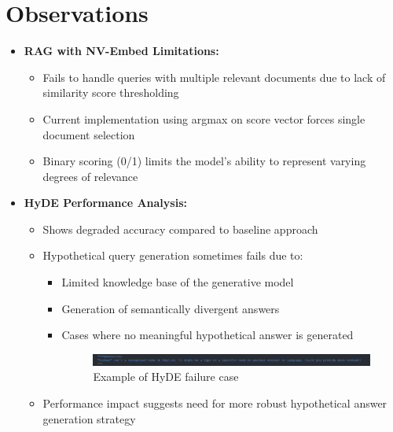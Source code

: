 \section{Observations}
\begin{itemize}
    \item \textbf{RAG with NV-Embed Limitations:}
    \begin{itemize}
        \item Fails to handle queries with multiple relevant documents due to lack of similarity score thresholding
        \item Current implementation using argmax on score vector forces single document selection
        \item Binary scoring (0/1) limits the model's ability to represent varying degrees of relevance
    \end{itemize}
    
    \item \textbf{HyDE Performance Analysis:}
    \begin{itemize}
        \item Shows degraded accuracy compared to baseline approach
        \item Hypothetical query generation sometimes fails due to:
        \begin{itemize}
            \item Limited knowledge base of the generative model
            \item Generation of semantically divergent answers
            \item Cases where no meaningful hypothetical answer is generated
            \begin{figure}[ht]
                \centering
                \includegraphics[width=1.0\textwidth, height=0.05\textheight]{IMAGE/hyde_fail.png}
                \caption{Example of HyDE failure case}
                \label{fig:hyde_failure}
            \end{figure}
        \end{itemize}
        \item Performance impact suggests need for more robust hypothetical answer generation strategy
    \end{itemize}
\end{itemize}


